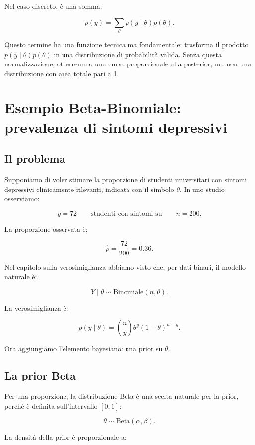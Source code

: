 \documentclass[
  italian,
  letterpaper,
  a4paper,
  11pt,
  open=any]{scrbook}
\theoremstyle{plain}
\theoremstyle{definition}
\theoremstyle{definition}
\theoremstyle{remark}
\begin{document}
Nel caso discreto, è una somma:

\[
p(y) = \sum_{\theta} p(y \mid \theta)p(\theta).
\]

Questo termine ha una funzione tecnica ma fondamentale: trasforma il
prodotto \(p(y \mid \theta)p(\theta)\) in una distribuzione di
probabilità valida. Senza questa normalizzazione, otterremmo una curva
proporzionale alla posterior, ma non una distribuzione con area totale
pari a 1.

\section{Esempio Beta-Binomiale: prevalenza di sintomi
depressivi}\label{sec-beta-binomial-update}

\subsection{Il problema}\label{il-problema-1}

Supponiamo di voler stimare la proporzione di studenti universitari con
sintomi depressivi clinicamente rilevanti, indicata con il simbolo
\(\theta\). In uno studio osserviamo:

\[
y = 72
\qquad \text{studenti con sintomi su} \qquad
n = 200.
\]

La proporzione osservata è:

\[
\hat{p} = \frac{72}{200} = 0.36.
\]

Nel capitolo sulla verosimiglianza abbiamo visto che, per dati binari,
il modello naturale è:

\[
Y \mid \theta \sim \text{Binomiale}(n, \theta).
\]

La verosimiglianza è:

\[
p(y \mid \theta) = \binom{n}{y}\theta^y(1-\theta)^{n-y}.
\]

Ora aggiungiamo l'elemento bayesiano: una prior su \(\theta\).

\subsection{La prior Beta}\label{la-prior-beta}

Per una proporzione, la distribuzione Beta è una scelta naturale per la
prior, perché è definita sull'intervallo \([0,1]\):

\[
\theta \sim \text{Beta}(\alpha, \beta).
\]

La densità della prior è proporzionale a:
\end{document}
